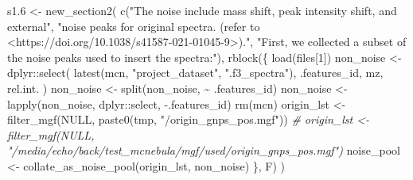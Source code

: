 \documentclass[
]{article}
\newenvironment{Shaded}{\begin{snugshade}}{\end{snugshade}}
\newcommand{\CommentTok}[1]{\textcolor[rgb]{0.56,0.35,0.01}{\textit{#1}}}
\newcommand{\ConstantTok}[1]{\textcolor[rgb]{0.00,0.00,0.00}{#1}}
\newcommand{\DecValTok}[1]{\textcolor[rgb]{0.00,0.00,0.81}{#1}}
\newcommand{\FloatTok}[1]{\textcolor[rgb]{0.00,0.00,0.81}{#1}}
\newcommand{\FunctionTok}[1]{\textcolor[rgb]{0.00,0.00,0.00}{#1}}
\newcommand{\NormalTok}[1]{#1}
\newcommand{\OtherTok}[1]{\textcolor[rgb]{0.56,0.35,0.01}{#1}}
\newcommand{\SpecialCharTok}[1]{\textcolor[rgb]{0.00,0.00,0.00}{#1}}
\newcommand{\StringTok}[1]{\textcolor[rgb]{0.31,0.60,0.02}{#1}}
\begin{document}
\begin{Shaded}
\begin{Highlighting}[]
\NormalTok{s1}\FloatTok{.6} \OtherTok{\textless{}{-}} \FunctionTok{new\_section2}\NormalTok{(}
  \FunctionTok{c}\NormalTok{(}\StringTok{"The \textquotesingle{}noise\textquotesingle{} include mass shift, peak intensity shift, and external"}\NormalTok{,}
    \StringTok{"noise peaks for original spectra. (refer to \textless{}https://doi.org/10.1038/s41587{-}021{-}01045{-}9\textgreater{})."}\NormalTok{,}
    \StringTok{"First, we collected a subset of the noise peaks used to insert the spectra:"}\NormalTok{),}
  \FunctionTok{rblock}\NormalTok{(\{}
    \FunctionTok{load}\NormalTok{(files[}\DecValTok{1}\NormalTok{])}
\NormalTok{    non\_noise }\OtherTok{\textless{}{-}}\NormalTok{ dplyr}\SpecialCharTok{::}\FunctionTok{select}\NormalTok{(}
      \FunctionTok{latest}\NormalTok{(mcn, }\StringTok{"project\_dataset"}\NormalTok{, }\StringTok{".f3\_spectra"}\NormalTok{),}
\NormalTok{      .features\_id, mz, rel.int.}
\NormalTok{    )}
\NormalTok{    non\_noise }\OtherTok{\textless{}{-}} \FunctionTok{split}\NormalTok{(non\_noise, }\SpecialCharTok{\textasciitilde{}}\NormalTok{ .features\_id)}
\NormalTok{    non\_noise }\OtherTok{\textless{}{-}} \FunctionTok{lapply}\NormalTok{(non\_noise, dplyr}\SpecialCharTok{::}\NormalTok{select, }\SpecialCharTok{{-}}\NormalTok{.features\_id)}
    \FunctionTok{rm}\NormalTok{(mcn)}
\NormalTok{    origin\_lst }\OtherTok{\textless{}{-}} \FunctionTok{filter\_mgf}\NormalTok{(}\ConstantTok{NULL}\NormalTok{, }\FunctionTok{paste0}\NormalTok{(tmp, }\StringTok{"/origin\_gnps\_pos.mgf"}\NormalTok{))}
    \CommentTok{\# origin\_lst \textless{}{-} filter\_mgf(NULL, "/media/echo/back/test\_mcnebula/mgf/used/origin\_gnps\_pos.mgf")}
\NormalTok{    noise\_pool }\OtherTok{\textless{}{-}} \FunctionTok{collate\_as\_noise\_pool}\NormalTok{(origin\_lst, non\_noise)}
\NormalTok{  \}, F)}
\NormalTok{)}


\end{Highlighting}
\end{Shaded}
\end{document}
